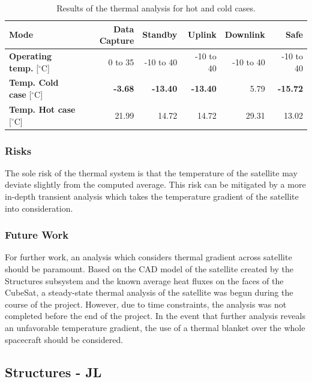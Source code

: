 \documentclass[12pt]{article}
\begin{document}
\begin{table}[ht]%
\caption{Results of the thermal analysis for hot and cold cases.}
\label{table:thermal-results}
\begin{tabular}{|l|r|r|r|r|r|}\hline
\textbf{Mode} & \textbf{Data Capture} & \textbf{Standby} & \textbf{Uplink} & \textbf{Downlink} & \textbf{Safe} \\\hline
\textbf{Operating temp.} [$^\circ$C] & 0 to 35 & -10 to 40 & -10 to 40 & -10 to 40 & -10 to 40 \\\hline
\textbf{Temp. Cold case} [$^\circ$C] & \textbf{-3.68} & \textbf{-13.40} & \textbf{-13.40} & 5.79 & \textbf{-15.72} \\\hline
\textbf{Temp. Hot case} [$^\circ$C] & 21.99 & 14.72 & 14.72 & 29.31 & 13.02 \\\hline
\end{tabular}
\end{table}

\subsubsection{Risks}

The sole risk of the thermal system is that the temperature of the satellite may deviate slightly from the computed average. This risk can be mitigated by a more in-depth transient analysis which takes the temperature gradient of the satellite into consideration. 

\subsubsection{Future Work}

For further work, an analysis which considers thermal gradient across satellite should be paramount. Based on the CAD model of the satellite created by the Structures subsystem and the known average heat fluxes on the faces of the CubeSat, a steady-state thermal analysis of the satellite was begun during the course of the project. However, due to time constraints, the analysis was not completed before the end of the project. In the event that further analysis reveals an unfavorable temperature gradient, the use of a thermal blanket over the whole spacecraft should be considered.

\newpage
\FloatBarrier

\subsection{Structures - JL}
\end{document}
